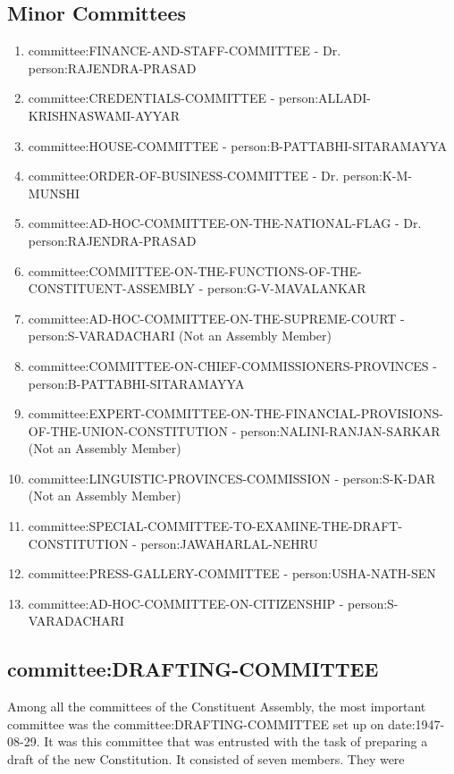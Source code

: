 \begin{multicols}{2}
\subsection{Minor Committees}

\begin{enumerate}
  \item \gls{committee:FINANCE-AND-STAFF-COMMITTEE} - Dr. \gls{person:RAJENDRA-PRASAD}
  \item \gls{committee:CREDENTIALS-COMMITTEE} - \gls{person:ALLADI-KRISHNASWAMI-AYYAR}
  \item \gls{committee:HOUSE-COMMITTEE} - \gls{person:B-PATTABHI-SITARAMAYYA}
  \item \gls{committee:ORDER-OF-BUSINESS-COMMITTEE} - Dr. \gls{person:K-M-MUNSHI}
  \item \gls{committee:AD-HOC-COMMITTEE-ON-THE-NATIONAL-FLAG} - Dr. \gls{person:RAJENDRA-PRASAD}
  \item \gls{committee:COMMITTEE-ON-THE-FUNCTIONS-OF-THE-CONSTITUENT-ASSEMBLY} - \gls{person:G-V-MAVALANKAR}
  \item \gls{committee:AD-HOC-COMMITTEE-ON-THE-SUPREME-COURT} - \gls{person:S-VARADACHARI} (Not an Assembly Member)
  \item \gls{committee:COMMITTEE-ON-CHIEF-COMMISSIONERS-PROVINCES} - \gls{person:B-PATTABHI-SITARAMAYYA}
  \item \gls{committee:EXPERT-COMMITTEE-ON-THE-FINANCIAL-PROVISIONS-OF-THE-UNION-CONSTITUTION} - \gls{person:NALINI-RANJAN-SARKAR} (Not an Assembly Member)
  \item \gls{committee:LINGUISTIC-PROVINCES-COMMISSION} - \gls{person:S-K-DAR} (Not an Assembly Member)
  \item \gls{committee:SPECIAL-COMMITTEE-TO-EXAMINE-THE-DRAFT-CONSTITUTION} - \gls{person:JAWAHARLAL-NEHRU}
  \item \gls{committee:PRESS-GALLERY-COMMITTEE} - \gls{person:USHA-NATH-SEN}
  \item \gls{committee:AD-HOC-COMMITTEE-ON-CITIZENSHIP} - \gls{person:S-VARADACHARI}
\end{enumerate}


\subsection{\gls{committee:DRAFTING-COMMITTEE}}

Among all the committees of the Constituent Assembly, the most important committee was the \gls{committee:DRAFTING-COMMITTEE} set up on \gls{date:1947-08-29}. It was this committee that was entrusted with the task of preparing a draft of the new Constitution. It consisted of seven members. They were


\end{multicols}
